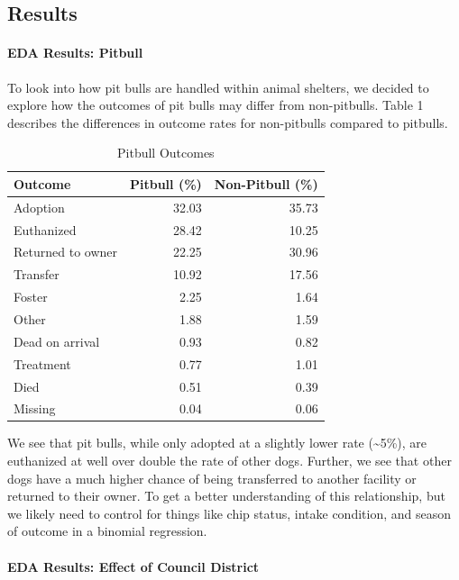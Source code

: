 \documentclass[]{article}
\let\oldparagraph\paragraph
\renewcommand{\paragraph}[1]{\oldparagraph{#1}\mbox{}}
\begin{document}
\subsection{Results}\label{results}

\paragraph{EDA Results: Pitbull}\label{eda-results-pitbull}

To look into how pit bulls are handled within animal shelters, we
decided to explore how the outcomes of pit bulls may differ from
non-pitbulls. Table 1 describes the differences in outcome rates for
non-pitbulls compared to pitbulls.

\begin{table}[H]

\caption{\label{tab:pitbull EDA table}Pitbull Outcomes}
\centering
\fontsize{7}{9}\selectfont
\begin{tabular}{lrr}
\toprule
Outcome & Pitbull (\%) & Non-Pitbull (\%)\\
\midrule
\rowcolor{gray!6}  Adoption & 32.03 & 35.73\\
Euthanized & 28.42 & 10.25\\
\rowcolor{gray!6}  Returned to owner & 22.25 & 30.96\\
Transfer & 10.92 & 17.56\\
\rowcolor{gray!6}  Foster & 2.25 & 1.64\\
Other & 1.88 & 1.59\\
\rowcolor{gray!6}  Dead on arrival & 0.93 & 0.82\\
Treatment & 0.77 & 1.01\\
\rowcolor{gray!6}  Died & 0.51 & 0.39\\
Missing & 0.04 & 0.06\\
\bottomrule
\end{tabular}
\end{table}

We see that pit bulls, while only adopted at a slightly lower rate
(\textasciitilde{}5\%), are euthanized at well over double the rate of
other dogs. Further, we see that other dogs have a much higher chance of
being transferred to another facility or returned to their owner. To get
a better understanding of this relationship, but we likely need to
control for things like chip status, intake condition, and season of
outcome in a binomial regression.

\paragraph{EDA Results: Effect of Council
District}\label{eda-results-effect-of-council-district}
\end{document}
